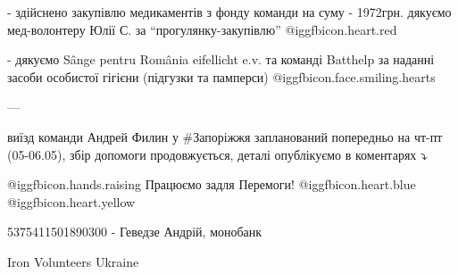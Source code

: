 - здійснено закупівлю медикаментів з фонду команди на суму - 1972грн. дякуємо
мед-волонтеру Юлії С. за \enquote{прогулянку-закупівлю} @igg{fbicon.heart.red}

- дякуємо Sânge pentru România eifellicht e.v. та команді Batthelp за наданні
засоби особистої гігієни (підгузки та памперси)  @igg{fbicon.face.smiling.hearts} 

---

виїзд команди Андрей Филин у \#Запоріжжя запланований попередньо на чт-пт
(05-06.05), збір допомоги продовжується, деталі опублікуємо в коментарях ⤵️

 @igg{fbicon.hands.raising}  Працюємо задля Перемоги!  @igg{fbicon.heart.blue}  @igg{fbicon.heart.yellow} 

5375411501890300 - Геведзе Андрій, монобанк

Iron Volunteers Ukraine
